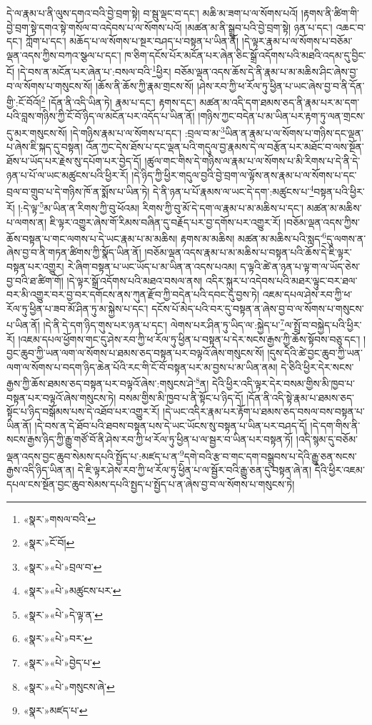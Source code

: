 དེ་ལ་རྣམ་པ་ནི་ལུས་དགའ་བའི་བྱེ་བྲག་སྟེ། བ་སྦུ་ལྡང་བ་དང་། མཆི་མ་ཟག་པ་ལ་སོགས་པའོ། །རྟགས་ནི་ཚིག་གི་བྱེ་བྲག་སྟེ་དགའ་སྟེ་གསོལ་བ་འདེབས་པ་ལ་སོགས་པའོ། །མཚན་མ་ནི་སྒྲུབ་པའི་བྱེ་བྲག་སྟེ། ཉན་པ་དང་། འཆང་བ་དང་། ཀློག་པ་དང་། མཆོད་པ་ལ་སོགས་པ་སྔར་བཤད་པ་བསྟན་པ་ཡིན་ནོ། །དེ་ལྟར་རྣམ་པ་ལ་སོགས་པ་བཅོམ་ལྡན་འདས་ཀྱིས་བཀའ་སྩལ་པ་དང་། ཁ་ཅིག་དངོས་པོར་མངོན་པར་ཞེན་ཅིང་སྒྲོ་འདོགས་པའི་མཐའི་འདམ་དུ་བྱིང་ངོ། །དེ་བས་ན་མངོན་པར་ཞེན་པ་:བསལ་བའི་\footnote{«སྣར་»གསལ་བའི་}ཕྱིར། བཅོམ་ལྡན་འདས་ཆོས་དེ་ནི་རྣམ་པ་མ་མཆིས་ཤིང་ཞེས་བྱ་བ་ལ་སོགས་པ་གསུངས་སོ། །ཆོས་ནི་ཆོས་ཀྱི་རྣམ་གྲངས་སོ། །ཤེས་རབ་ཀྱི་ཕ་རོལ་ཏུ་ཕྱིན་པ་ཡང་ཞེས་བྱ་བ་ནི་དོན་གྱི་:ངོ་བོའོ།\footnote{«སྣར་»ངོ་བོ།} །དོན་ནི་འདི་ཡིན་ཏེ། རྣམ་པ་དང་། རྟགས་དང་། མཚན་མ་འདི་དག་ཐམས་ཅད་ནི་རྣམ་པར་མ་དག་པའི་བླས་གཉིས་ཀྱི་ངོ་བོ་ཉིད་ལ་མངོན་པར་འདོད་པ་ཡིན་ནོ། །གཉིས་ཀྱང་བདེན་པ་མ་ཡིན་པར་རྟག་ཏུ་ལན་གྲངས་དུ་མར་གསུངས་སོ། །དེ་གཉིས་རྣམ་པ་ལ་སོགས་པ་དང་། :བྲལ་བ་མ་\footnote{«སྣར་»«པེ་»བྲལ་བ་}ཡིན་ན་རྣམ་པ་ལ་སོགས་པ་གཉིས་དང་ལྡན་པ་ཞེས་ཇི་སྐད་དུ་བསྟན། འོན་ཀྱང་དེས་ཐོས་པ་དང་ལྡན་པའི་གདུལ་བྱ་རྣམས་དེ་ལ་བརྩོན་པར་མཐོང་བ་ལས་སྔོན་ཐོས་པ་ཡོད་པར་རྗེས་སུ་དཔོག་པར་བྱེད་དོ། །ཚུལ་གང་གིས་དེ་གཉིས་ལ་རྣམ་པ་ལ་སོགས་པ་མི་རིགས་པ་དེ་ནི་དེ་ཉན་པ་པོ་ལ་ཡང་མཚུངས་པའི་ཕྱིར་རོ། །དེ་ཉིད་ཀྱི་ཕྱིར་གདུལ་བྱའི་བྱེ་བྲག་ལ་ལྟོས་ནས་རྣམ་པ་ལ་སོགས་པ་དང་བྲལ་བ་གྲུབ་པ་དེ་གཉིས་ཁོ་ན་སྨོས་པ་ཡིན་ཏེ། དེ་ནི་ཉན་པ་པོ་རྣམས་ལ་ཡང་དེ་དག་:མཚུངས་པ་\footnote{«སྣར་»«པེ་»མཚུངས་པར་}བསྟན་པའི་ཕྱིར་རོ། །:དེ་ལྟ་\footnote{«སྣར་»«པེ་»དེ་ལྟ་ན་}མ་ཡིན་ན་རིགས་ཀྱི་བུ་ཕོའམ། རིགས་ཀྱི་བུ་མོ་དེ་དག་ལ་རྣམ་པ་མ་མཆིས་པ་དང་། མཚན་མ་མཆིས་པ་ལགས་ན། ཇི་ལྟར་འགྱུར་ཞེས་གོ་རིམས་བཞིན་དུ་བརྗོད་པར་བྱ་དགོས་པར་འགྱུར་རོ། །བཅོམ་ལྡན་འདས་ཀྱིས་ཆོས་བསྟན་པ་གང་ལགས་པ་དེ་ཡང་རྣམ་པ་མ་མཆིས། རྟགས་མ་མཆིས། མཚན་མ་མཆིས་པའི་སླད་\footnote{«སྣར་»«པེ་»བར་}དུ་ལགས་ན་ཞེས་བྱ་བ་ནི་གཏན་ཚིགས་ཀྱི་སྣོད་ཡིན་ནོ། །བཅོམ་ལྡན་འདས་རྣམ་པ་མ་མཆིས་པ་བསྟན་པའི་ཆོས་དེ་ཇི་ལྟར་བསྟན་པར་འགྱུར། རེ་ཞིག་བསྟན་པ་ཡང་ཡོད་པ་མ་ཡིན་ན་འདས་པའམ། ད་ལྟའི་ཚེ་ན་ཉན་པ་ལྟ་ག་ལ་ཡོད་ཅེས་བྱ་བའི་ཐ་ཚིག་གོ། །དེ་ལྟར་སྒྲོ་འདོགས་པའི་མཐའ་བསལ་ནས། འདིར་སྐུར་པ་འདེབས་པའི་མཐར་ལྟུང་བར་ཐལ་བར་མི་འགྱུར་བར་བྱ་བར་དགོངས་ནས་ཀུན་རྫོབ་ཀྱི་བདེན་པའི་དབང་དུ་བྱས་ཏེ། འཇམ་དཔལ་ཤེས་རབ་ཀྱི་ཕ་རོལ་ཏུ་ཕྱིན་པ་ཟབ་མོ་ཤིན་ཏུ་མ་སྐྱེས་པ་དང་། དངོས་པོ་མེད་པའི་བར་དུ་བསྟན་ན་ཞེས་བྱ་བ་ལ་སོགས་པ་གསུངས་པ་ཡིན་ནོ། །དེ་ནི་དེ་དག་ཉིད་གུས་པར་ཉན་པ་དང་། ལེགས་པར་ཤིན་ཏུ་ཡིད་ལ་:སྐྱེད་པ་\footnote{«སྣར་»«པེ་»བྱེད་པ་}ལ་སྤྲོ་བ་བསྐྱེད་པའི་ཕྱིར་རོ། །འཇམ་དཔལ་ཕྱོགས་གང་དུ་ཤེས་རབ་ཀྱི་ཕ་རོལ་ཏུ་ཕྱིན་པ་བསྟན་པ་དེར་སངས་རྒྱས་ཀྱི་ཆོས་སྟོབས་བཅུ་དང་། །བྱང་ཆུབ་ཀྱི་ཡན་ལག་ལ་སོགས་པ་ཐམས་ཅད་བསྟན་པར་བལྟའོ་ཞེས་གསུངས་སོ། །དུས་དེའི་ཚེ་བྱང་ཆུབ་ཀྱི་ཡན་ལག་ལ་སོགས་པ་བདག་ཉིད་ཆེན་པོའི་རང་གི་ངོ་བོ་བསྟན་པར་མ་བྱས་པ་མ་ཡིན་ནམ། དེ་ཅིའི་ཕྱིར་དེར་སངས་རྒྱས་ཀྱི་ཆོས་ཐམས་ཅད་བསྟན་པར་བལྟའོ་ཞེས་:གསུངས་ཤེ་\footnote{«སྣར་»«པེ་»གསུངས་ཞེ་}ན། དེའི་ཕྱིར་འདི་ལྟར་དེར་བསམ་གྱིས་མི་ཁྱབ་པ་བསྟན་པར་བལྟའོ་ཞེས་གསུངས་ཏེ། བསམ་གྱིས་མི་ཁྱབ་པ་ནི་སྟོང་པ་ཉིད་དོ། །དོན་ནི་འདི་སྟེ་རྣམ་པ་ཐམས་ཅད་སྟོང་པ་ཉིད་བསྒོམས་པས་དེ་འཐོབ་པར་འགྱུར་རོ། །དེ་ཡང་འདིར་རྣམ་པར་རྟོག་པ་ཐམས་ཅད་བསལ་བས་བསྟན་པ་ཡིན་ནོ། །དེ་བས་ན་དེ་ཐོབ་པའི་ཐབས་བསྟན་པས་དེ་ཡང་ཡོངས་སུ་བསྟན་པ་ཡིན་པར་བཤད་དོ། །དེ་དག་གིས་ནི་སངས་རྒྱས་ཉིད་ཀྱི་རྒྱུ་གཙོ་བོ་ནི་ཤེས་རབ་ཀྱི་ཕ་རོལ་ཏུ་ཕྱིན་པ་ལ་སྦྱར་བ་ཡིན་པར་བསྟན་ཏོ། །འདི་སྙམ་དུ་བཅོམ་ལྡན་འདས་བྱང་ཆུབ་སེམས་དཔའི་སྤྱོད་པ་:མཛད་པ་ན་\footnote{«སྣར་»མཛད་པ་}དགེ་བའི་རྩ་བ་གང་དག་བསྒྲུབས་པ་དེའི་རྒྱུ་ཅན་སངས་རྒྱས་འདི་ཉིད་ཡིན་ན། དེ་ཇི་ལྟར་ཤེས་རབ་ཀྱི་ཕ་རོལ་ཏུ་ཕྱིན་པ་ལ་སྦྱོར་བའི་རྒྱུ་ཅན་དུ་བསྟན་ཞེ་ན། དེའི་ཕྱིར་འཇམ་དཔལ་ངས་སྔོན་བྱང་ཆུབ་སེམས་དཔའི་སྤྱད་པ་སྤྱོད་པ་ན་ཞེས་བྱ་བ་ལ་སོགས་པ་གསུངས་ཏེ། 